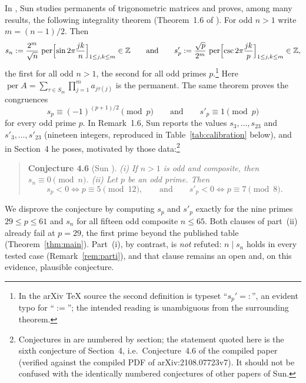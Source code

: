 \documentclass[10pt]{article}
\theoremstyle{remark}
\DeclareMathOperator{\per}{per}
\newcommand{\Z}{\mathbb{Z}}
\begin{document}
In \cite{Sun2021}, Sun studies permanents of trigonometric matrices and
proves, among many results, the following integrality theorem
(Theorem~1.6 of \cite{Sun2021}). For odd $n>1$ write $m=(n-1)/2$. Then
\begin{equation}\label{eq:defs}
s_n := \frac{2^{m}}{\sqrt n}\,
       \per\Bigl[\sin 2\pi\frac{jk}{n}\Bigr]_{1\le j,k\le m} \in \Z
\qquad\text{and}\qquad
s'_p := \frac{\sqrt p}{2^{m}}\,
       \per\Bigl[\csc 2\pi\frac{jk}{p}\Bigr]_{1\le j,k\le m} \in \Z,
\end{equation}
the first for all odd $n>1$, the second for all odd primes
$p$.\footnote{In the arXiv \TeX{} source the second definition is typeset
``$s_p'=:$'', an evident typo for ``$:=$''; the intended reading is
unambiguous from the surrounding theorem.} Here $\per A = \sum_{\tau\in
S_m}\prod_{j=1}^{m} a_{j\tau(j)}$ is the permanent. The same theorem proves
the congruences
\begin{equation}\label{eq:cong}
s_p \equiv (-1)^{(p+1)/2} \pmod p
\qquad\text{and}\qquad
s'_p \equiv 1 \pmod p
\end{equation}
for every odd prime $p$. In Remark~1.6, Sun reports the values
$s_3,\dots,s_{23}$ and $s'_3,\dots,s'_{23}$ (nineteen integers, reproduced
in Table~\ref{tab:calibration} below), and in Section~4 he poses, motivated
by those data:\footnote{Conjectures in \cite{Sun2021} are numbered by
section; the statement quoted here is the sixth conjecture of Section~4,
i.e.\ Conjecture~4.6 of the compiled paper (verified against the compiled
PDF of arXiv:2108.07723v7). It should not be confused with the identically
numbered conjectures of other papers of Sun.}

\begin{quote}
\textbf{Conjecture 4.6} (Sun \cite{Sun2021}). \emph{(i) If $n>1$ is odd and
composite, then $s_n\equiv 0\pmod n$. (ii) Let $p$ be an odd prime. Then
\[
s_p<0 \iff p\equiv 5 \pmod{12},
\qquad\text{and}\qquad
s'_p<0 \iff p\equiv 7 \pmod 8.
\]}
\end{quote}

\noindent
We disprove the conjecture by computing $s_p$ and $s'_p$ exactly for the
nine primes $29\le p\le 61$ and $s_n$ for all fifteen odd composite
$n\le 65$. Both clauses of part~(ii) already fail at $p=29$, the first
prime beyond the published table (Theorem~\ref{thm:main}). Part~(i), by
contrast, is \emph{not} refuted: $n\mid s_n$ holds in every tested case
(Remark~\ref{rem:parti}), and that clause remains an open and, on this
evidence, plausible conjecture.
\end{document}
